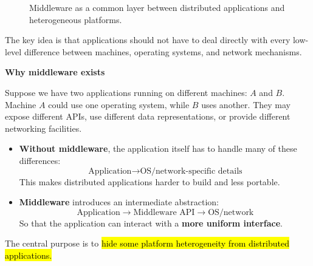 \begin{figure}[!htp]
    \caption{Middleware as a common layer between distributed applications and heterogeneous platforms.}
\end{figure}

\noindent
The key idea is that applications should not have to deal directly with every low-level difference between machines, operating systems, and network mechanisms.

\highspace
\begin{flushleft}
    \textcolor{Green3}{ \textbf{Why middleware exists}}
\end{flushleft}
Suppose we have two applications running on different machines: $A$ and $B$. Machine $A$ could use one operating system, while $B$ uses another. They may expose different APIs, use different data representations, or provide different networking facilities.
\begin{itemize}
    \item \textbf{Without middleware}, the application itself has to handle many of these differences:
        \begin{equation*}
            \text{Application}
            \rightarrow
            \text{OS/network-specific details}
        \end{equation*}
        This makes distributed applications harder to build and less portable.

    \item \textbf{Middleware} introduces an intermediate abstraction:
        \begin{equation*}
            \text{Application}
            \rightarrow
            \boxed{\text{Middleware API}}
            \rightarrow
            \text{OS/network}
        \end{equation*}
        So that the application can interact with a \textbf{more uniform interface}.
\end{itemize}
The central purpose is to \hl{hide some platform heterogeneity from distributed applications.}

